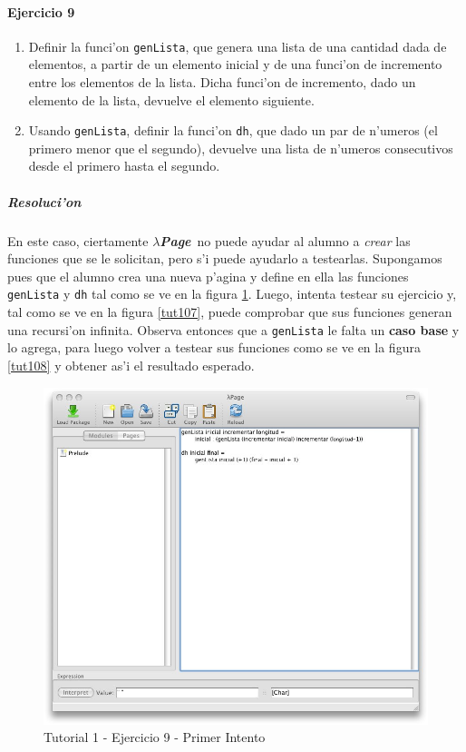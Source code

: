 \documentclass[a4paper]{article}
\newcommand{\hpage}{\textbf{\textsl{$\lambda$Page}}}
\begin{document}
\paragraph{Ejercicio 9}
\renewcommand{\theenumi}{\Roman{enumi}}
\begin{enumerate}
	\item Definir la funci'on \texttt{genLista}, que genera una lista de una cantidad dada de elementos, a partir de un elemento inicial y de una funci'on de incremento entre los elementos de la lista.  Dicha funci'on de incremento, dado un elemento de la lista, devuelve el elemento siguiente.
	\item Usando \texttt{genLista}, definir la funci'on \texttt{dh}, que dado un par de n'umeros (el primero menor que el segundo), devuelve una lista de n'umeros consecutivos desde el primero hasta el segundo.
\end{enumerate}
\renewcommand{\theenumi}{\arabic{enumi}}
\subparagraph{Resoluci'on}En este caso, ciertamente \hpage\ no puede ayudar al alumno a \textsl{crear} las funciones que se le solicitan, pero s'i puede ayudarlo a testearlas.  Supongamos pues que el alumno crea una nueva p'agina y define en ella las funciones \texttt{genLista} y \texttt{dh} tal como se ve en la figura \ref{tut106}.  Luego, intenta testear su ejercicio y, tal como se ve en la figura \ref{tut107}, puede comprobar que sus funciones generan una recursi'on infinita.  Observa entonces que a \texttt{genLista} le falta un \textbf{caso base} y lo agrega, para luego volver a testear sus funciones como se ve en la figura \ref{tut108} y obtener as'i el resultado esperado.
\begin{figure}[hp]
	\begin{center}
        	\includegraphics[width=.9\textwidth]{pictures/tut1/06}
		\caption{Tutorial 1 - Ejercicio 9 - Primer Intento}
		\label{tut106}
	\end{center}
\end{figure}
\end{document}
